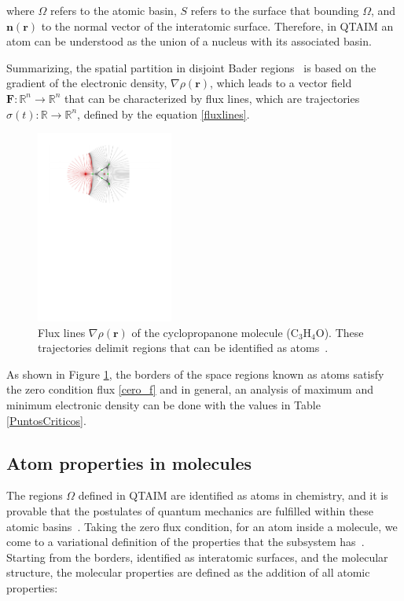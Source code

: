 \noindent where $\Omega$ refers to the atomic basin, $S$ refers
to the surface that bounding $\Omega$,
and $\mathbf{n}(\mathbf{r})$ to the normal vector
of the interatomic surface.
Therefore, in QTAIM an atom can be understood
as the union of a nucleus with its
associated basin.

Summarizing, the spatial partition in disjoint Bader regions~\cite{bader} is
based on the gradient of the electronic density, $\nabla \rho(\mathbf{r})$,
which leads to a vector field $\mathbf{F}:\mathbb{R}^{n} \to \mathbb{R}^{n}$
that can be characterized by flux lines, which are trajectories
$\sigma(t):\mathbb{R} \to \mathbb{R}^{n}$, defined by the equation
\ref{fluxlines}.

\begin{figure}
\centering
\includegraphics[width=0.4\textwidth]{3/img/flux}
\caption{Flux lines 
$\nabla \rho(\mathbf{r})$ of the
cyclopropanone molecule (C$_3$H$_4$O).
These trajectories delimit regions that can be
identified as atoms~\cite{todd}.}
\label{flux}
\end{figure}

As shown in Figure \ref{flux}, the borders of the space regions known as
atoms satisfy the zero condition flux \ref{cero_f} and in general, 
an analysis of maximum and minimum electronic density can
be done with the values in Table
\ref{PuntosCriticos}.

\subsection{Atom properties in molecules}

The regions $\Omega$ defined in QTAIM are identified as
atoms in chemistry, and it is provable that the postulates of quantum mechanics
are fulfilled within these atomic basins~\cite{bader}. Taking the zero flux
condition, for an atom inside a molecule, we come to a variational definition
of the properties that the subsystem has~\cite{Bieglerknig1982}.  Starting from
the borders, identified as interatomic surfaces, and the molecular structure,
the molecular properties are defined as the addition of all atomic properties:


